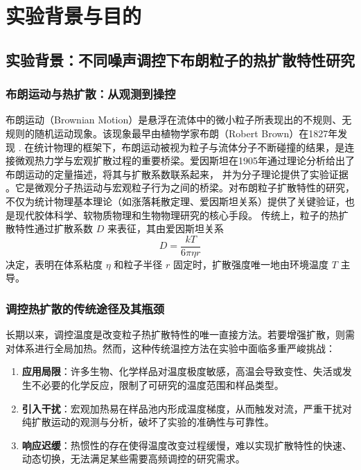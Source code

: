 \documentclass[a4paper]{report} %
\begin{document}
\tableofcontents

\chapter{实验背景与目的}

\section{实验背景：不同噪声调控下布朗粒子的热扩散特性研究}

\subsection{布朗运动与热扩散：从观测到操控}
布朗运动（Brownian Motion）是悬浮在流体中的微小粒子所表现出的不规则、无规则的随机运动现象。该现象最早由植物学家布朗（Robert Brown）在1827年发现 \cite{brown1828}. 
在统计物理的框架下，布朗运动被视为粒子与流体分子不断碰撞的结果，是连接微观热力学与宏观扩散过程的重要桥梁。爱因斯坦在1905年通过理论分析给出了布朗运动的定量描述，将其与扩散系数联系起来，
并为分子理论提供了实验证据 \cite{einstein1905}。它是微观分子热运动与宏观粒子行为之间的桥梁。对布朗粒子扩散特性的研究，不仅为统计物理基本理论（如涨落耗散定理、爱因斯坦关系）提供了关键验证，也是现代胶体科学、软物质物理和生物物理研究的核心手段。
传统上，粒子的热扩散特性通过扩散系数 $D$ 来表征，其由爱因斯坦关系
\[
D = \frac{kT}{6\pi \eta r}
\]
决定，表明在体系粘度 $\eta$ 和粒子半径 $r$ 固定时，扩散强度唯一地由环境温度 $T$ 主导。

\subsection{调控热扩散的传统途径及其瓶颈}
长期以来，调控温度是改变粒子热扩散特性的唯一直接方法。若要增强扩散，则需对体系进行全局加热。然而，这种传统温控方法在实验中面临多重严峻挑战：

\begin{enumerate}
  \item \textbf{应用局限}：许多生物、化学样品对温度极度敏感，高温会导致变性、失活或发生不必要的化学反应，限制了可研究的温度范围和样品类型。
  \item \textbf{引入干扰}：宏观加热易在样品池内形成温度梯度，从而触发对流，严重干扰对纯扩散运动的观测与分析，破坏了实验的准确性与可靠性。
  \item \textbf{响应迟缓}：热惯性的存在使得温度改变过程缓慢，难以实现扩散特性的快速、动态切换，无法满足某些需要高频调控的研究需求。
\end{enumerate}
\end{document}
